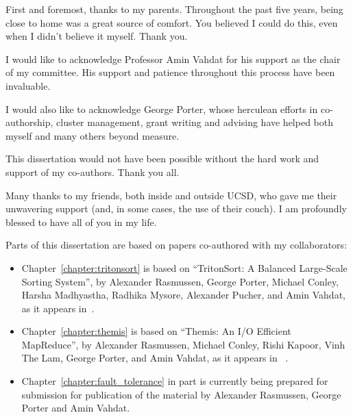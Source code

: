 \begin{acknowledgements}

First and foremost, thanks to my parents. Throughout the past five years, being
close to home was a great source of comfort. You believed I could do this, even
when I didn't believe it myself. Thank you.

I would like to acknowledge Professor Amin Vahdat for his support as the chair
of my committee.  His support and patience throughout this process have been
invaluable.

I would also like to acknowledge George Porter, whose herculean efforts in
co-authorship, cluster management, grant writing and advising have helped
both myself and many others beyond measure.

This dissertation would not have been possible without the hard work and
support of my co-authors. Thank you all.

Many thanks to my friends, both inside and outside UCSD, who gave me their
unwavering support (and, in some cases, the use of their couch). I am
profoundly blessed to have all of you in my life.

Parts of this dissertation are based on papers co-authored with my
collaborators:

\begin{itemize}
  \item Chapter~\ref{chapter:tritonsort} is based on ``TritonSort: A Balanced
    Large-Scale Sorting System'', by Alexander Rasmussen, George Porter,
    Michael Conley, Harsha Madhyastha, Radhika Mysore, Alexander Pucher, and
    Amin Vahdat, as it appears in~\cite{tritonsort}.
  \item Chapter~\ref{chapter:themis} is based on ``Themis: An I/O Efficient
    MapReduce'', by Alexander Rasmussen, Michael Conley, Rishi Kapoor, Vinh The
    Lam, George Porter, and Amin Vahdat, as it appears in ~\cite{themis}.
  \item Chapter~\ref{chapter:fault_tolerance} in part is currently being
    prepared for submission for publication of the material by Alexander
    Rasmussen, George Porter and Amin Vahdat.
\end{itemize}

\end{acknowledgements}
